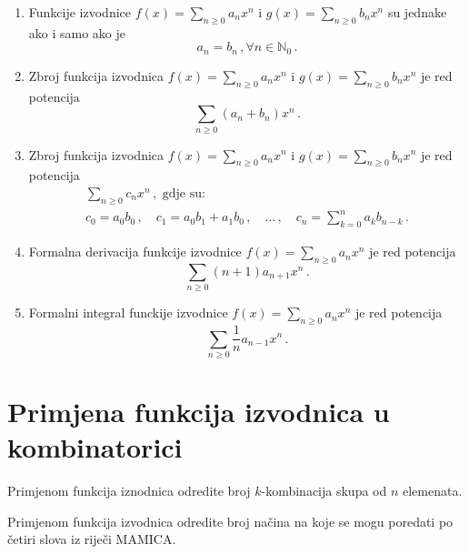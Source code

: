 \begin{enumerate}
    \item Funkcije izvodnice $f(x) = \sum_{n\geq 0}a_nx^n$ i
    $g(x) = \sum_{n\geq 0}b_nx^n$ su jednake ako i samo ako je
    $$
        a_n = b_n\,, \forall n \in \mathbb{N}_0\,.
    $$
    \item Zbroj funkcija izvodnica $f(x) = \sum_{n\geq 0} a_nx^n$ i
    $g(x) = \sum_{n\geq 0}b_nx^n$ je red potencija
    $$
        \sum_{n\geq 0} (a_n + b_n)x^n\,.
    $$
    \item Zbroj funkcija izvodnica $f(x) = \sum_{n\geq 0} a_nx^n$ i
    $g(x) = \sum_{n\geq 0}b_nx^n$ je red potencija
    \begin{gather*}
        \sum_{n\geq 0} c_nx^n\,, \text{ gdje su:}\\
        c_0=a_0b_0\,,\quad c_1 = a_0b_1 + a_1b_0\,,\quad \dots\,,\quad c_n = \sum_{k=0}^n a_kb_{n-k}\,.
    \end{gather*}

    \item Formalna derivacija funkcije izvodnice $f(x) = \sum_{n\geq 0} a_nx^n$ je red potencija
    $$
        \sum_{n\geq 0} (n+1)a_{n+1}x^n\,.
    $$
    \item Formalni integral funckije izvodnice $f(x) = \sum_{n\geq 0} a_n x^n$ je red potencija
    $$
        \sum_{n\geq 0} \frac{1}{n} a_{n-1}x^n\,.
    $$
\end{enumerate}

\section{Primjena funkcija izvodnica u kombinatorici}

\begin{problem}
    Primjenom funkcija iznodnica odredite broj $k$-kombinacija skupa od $n$ elemenata.
\end{problem}

\begin{problem}
    Primjenom funkcija izvodnica odredite broj načina na koje se mogu poredati po četiri slova iz riječi $\mathrm{MAMICA}$.
\end{problem}
